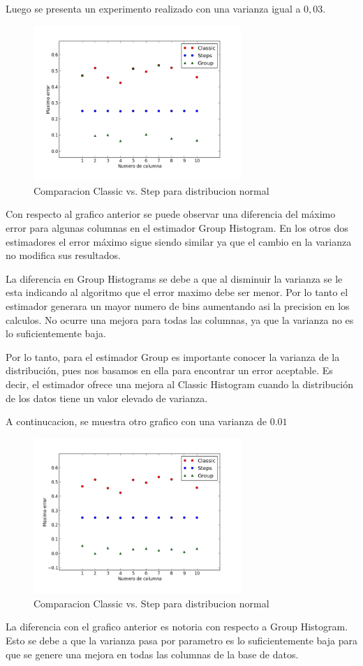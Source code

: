 \documentclass[10pt, a4paper,english,spanish,hidelinks]{article}
\begin{document}
Luego se presenta un experimento realizado con una varianza igual a $0,03$. 
\newpage
\begin{figure}
  \centering
  \includegraphics[width=0.7\textwidth]{./imagenes/ejb2_normal_t_003.png}
  \caption{Comparacion Classic vs. Step para distribucion normal}
\end{figure}

Con respecto al grafico anterior se puede observar una diferencia del máximo error para algunas columnas en el estimador Group Histogram. En los otros dos estimadores el error máximo sigue siendo similar ya que el cambio en la varianza no modifica sus resultados. 

La diferencia en Group Histograms se debe a que al disminuir la varianza se le esta indicando al algoritmo que el error maximo debe ser menor. Por lo tanto el estimador generara un mayor numero de bins aumentando asi la precision en los calculos. No ocurre una mejora para todas las columnas, ya que la varianza no es lo suficientemente baja. 

Por lo tanto, para el estimador Group es importante conocer la varianza de la distribución, pues nos
basamos en ella para encontrar un error aceptable. Es decir, el estimador ofrece una mejora al Classic Histogram cuando la distribución de los datos tiene un valor elevado de varianza.

A continucacion, se muestra otro grafico con una varianza de $0.01$
\newpage
\begin{figure}
  \centering
  \includegraphics[width=0.7\textwidth]{./imagenes/ejb2_normal_t_001.png}
  \caption{Comparacion Classic vs. Step para distribucion normal}
\end{figure}

La diferencia con el grafico anterior es notoria con respecto a Group Histogram. Esto se debe a que la varianza pasa por parametro es lo suficientemente baja para que se genere una mejora en todas las columnas de la base de datos. 
\end{document}
